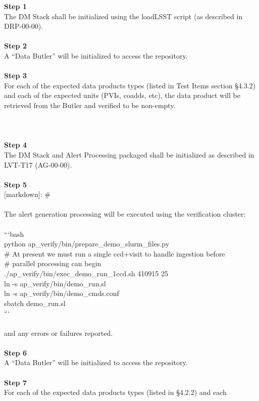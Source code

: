\textbf{Step 1}\\
The DM Stack shall be initialized using the loadLSST script (as
described in DRP-00-00).\\
~\\
\textbf{Step 2}\\
A ``Data Butler'' will be initialized to access the repository.\\
~\\
\textbf{Step 3}\\
For each of the expected data products types (listed in Test Items
section §4.3.2) and each of the expected units (PVIs, coadds, etc), the
data product will be retrieved from the Butler and verified to be
non-empty.\\
~\\
~\\
~\\
\textbf{Step 4}\\
The DM Stack and Alert Processing packaged shall be initialized as
described in LVT-T17 (AG-00-00).\\
~\\
\textbf{Step 5}\\
{[}markdown{]}: \#\\
~\\
The alert generation processing will be executed using the verification
cluster:\\
~\\
```bash\\
python ap\_verify/bin/prepare\_demo\_slurm\_files.py\\
\# At present we must run a single ccd+visit to handle ingestion
before\\
\# parallel processing can begin\\
./ap\_verify/bin/exec\_demo\_run\_1ccd.sh 410915 25\\
ln -s ap\_verify/bin/demo\_run.sl\\
ln -s ap\_verify/bin/demo\_cmds.conf\\
sbatch demo\_run.sl\\
```\\
~\\
and any errors or failures reported.\\
~\\
\textbf{Step 6}\\
A ``Data Butler'' will be initialized to access the repository.\\
~\\
\textbf{Step 7}\\
For each of the expected data products types (listed in §4.2.2) and each
